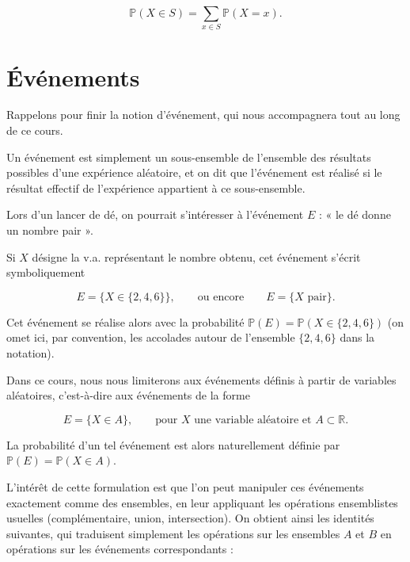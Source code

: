 $$
\mathbb{P}(X \in S) = \sum_{x \in S} \mathbb{P}(X = x).
$$

\section{Événements}

Rappelons pour finir la notion d'événement, qui nous accompagnera tout au long de ce cours. 

\medskip

\begin{mdframed}
\begin{definition}
Un événement est simplement un sous-ensemble de l'ensemble des résultats possibles d'une expérience aléatoire, et on dit que l'événement est réalisé si le résultat effectif de l'expérience appartient à ce sous-ensemble.
\end{definition}
\end{mdframed}

\begin{exemple}
Lors d'un lancer de dé, on pourrait s'intéresser à l'événement $E$ : « le dé donne un nombre pair ». 

Si $X$ désigne la v.a. représentant le nombre obtenu, cet événement s'écrit symboliquement

$$
E = \{X \in \{2, 4, 6\}\}, \qquad \text{ou encore} \qquad E = \{X \text{ pair}\}.
$$

Cet événement se réalise alors avec la probabilité $\mathbb{P}(E) = \mathbb{P}(X \in \{2, 4, 6\})$ (on omet ici, par convention, les accolades autour de l'ensemble $\{2,4,6\}$ dans la notation).
\end{exemple}

Dans ce cours, nous nous limiterons aux événements définis à partir de variables aléatoires, c'est-à-dire aux événements de la forme

$$
E = \{X \in A\}, \qquad \text{pour } X \text{ une variable aléatoire et } A \subset \mathbb{R}.
$$

La probabilité d'un tel événement est alors naturellement définie par $\mathbb{P}(E) = \mathbb{P}(X \in A)$.

L'intérêt de cette formulation est que l'on peut manipuler ces événements exactement comme des ensembles, en leur appliquant les opérations ensemblistes usuelles (complémentaire, union, intersection). On obtient ainsi les identités suivantes, qui traduisent simplement les opérations sur les ensembles $A$ et $B$ en opérations sur les événements correspondants :

